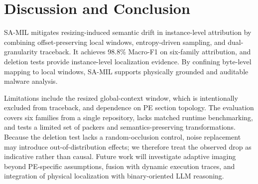 \documentclass[runningheads]{llncs}
\begin{document}
\section{Discussion and Conclusion}

SA-MIL mitigates resizing-induced semantic drift in instance-level attribution by combining offset-preserving local windows, entropy-driven sampling, and dual-granularity traceback. It achieves 98.8\% Macro-F1 on six-family attribution, and deletion tests provide instance-level localization evidence. By confining byte-level mapping to local windows, SA-MIL supports physically grounded and auditable malware analysis.

Limitations include the resized global-context window, which is intentionally excluded from traceback, and dependence on PE section topology. The evaluation covers six families from a single repository, lacks matched runtime benchmarking, and tests a limited set of packers and semantics-preserving transformations. Because the deletion test lacks a random-occlusion control, noise replacement may introduce out-of-distribution effects; we therefore treat the observed drop as indicative rather than causal. Future work will investigate adaptive imaging beyond PE-specific assumptions, fusion with dynamic execution traces, and integration of physical localization with binary-oriented LLM reasoning.



\end{document}
